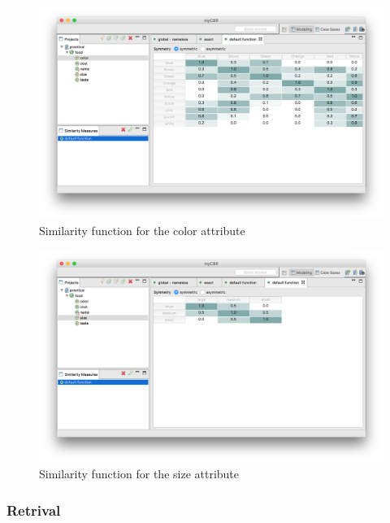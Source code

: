 \documentclass[paper=a4, fontsize=11pt]{scrartcl} %
\numberwithin{equation}{section} %
\numberwithin{figure}{section} %
\numberwithin{table}{section} %
\begin{document}
\begin{figure}[h]
    \centering
    \includegraphics[width=\linewidth]{img/color.png}
    \caption{Similarity function for the color attribute} \label{fig:color}
\end{figure}


\begin{figure}[h]
    \centering
    \includegraphics[width=\linewidth]{img/size.png}
    \caption{Similarity function for the size attribute} \label{fig:size}
\end{figure}

\subsubsection{Retrival}
\end{document}
